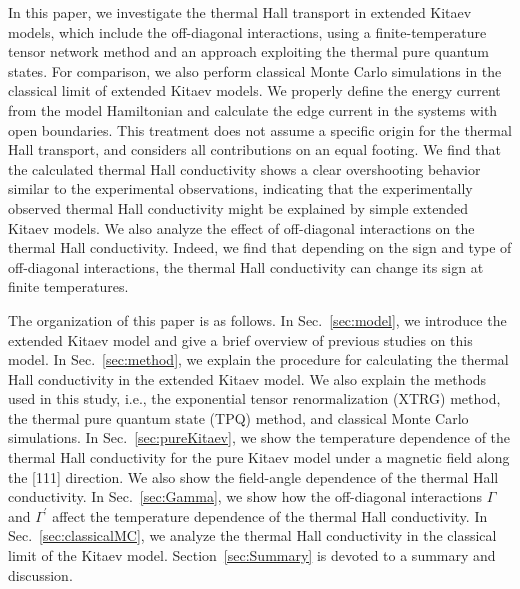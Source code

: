 \documentclass[twocolumn,superscriptaddress,showpacs, longbibliography, aps, prb]{revtex4-2}
\begin{document}
In this paper, we investigate the thermal Hall transport in 
extended Kitaev models, which include the off-diagonal interactions,
using a finite-temperature tensor network method and %
an approach exploiting the thermal pure quantum states. 
For comparison, we also perform %
classical Monte Carlo simulations
in the classical limit of %
extended Kitaev models.
We properly define the energy current from the model Hamiltonian 
and calculate the edge current in the systems with open boundaries. 
This treatment does not assume %
a specific origin for %
the thermal Hall transport, 
and considers all contributions on an equal footing.  
We find that %
the calculated thermal Hall conductivity shows a clear overshooting behavior similar to the experimental observations, indicating that the experimentally observed thermal Hall conductivity might be explained by %
simple extended Kitaev models.
We also %
analyze the effect of off-diagonal interactions on the thermal Hall conductivity. 
Indeed, we find that depending on the sign and %
type of %
off-diagonal %
interactions, the thermal Hall conductivity can change its sign at finite temperatures. 

The organization of this paper is as follows. 
In Sec.~\ref{sec:model}, we introduce the extended Kitaev model and
give a brief overview of previous studies on %
this model.
In Sec.~\ref{sec:method}, we explain %
the procedure for calculating the
thermal Hall conductivity %
in the extended Kitaev model.
We also explain the methods used in this study, i.e.,
the exponential tensor renormalization (XTRG) method,
the thermal pure quantum state (TPQ) method, and
classical Monte Carlo simulations.
In Sec.~\ref{sec:pureKitaev}, we show the temperature
dependence of the thermal Hall conductivity for the pure Kitaev model under a magnetic field
along the [111] direction. We also show the field-angle dependence 
of the thermal Hall conductivity.
In Sec.~\ref{sec:Gamma}, we show how the off-diagonal interactions
$\Gamma$ and $\Gamma^{\prime}$ %
affect the temperature
dependence of the thermal Hall conductivity.
In Sec.~\ref{sec:classicalMC}, we analyze 
the thermal Hall conductivity in the classical limit of the Kitaev model.
Section~\ref{sec:Summary} is devoted to a summary and discussion.
\end{document}
